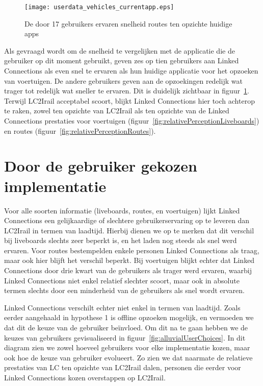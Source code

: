 \begin{figure}[ht]
	\centering
	\texttt{[image: userdata\_vehicles\_currentapp.eps]}
	\caption[Door gebruikers ervaren snelheid voertuigen tov huidige apps]{De door 17 gebruikers ervaren snelheid routes ten opzichte huidige apps }
	\label{fig:relativePerceptionVehicles}
\end{figure}

Als gevraagd wordt om de snelheid te vergelijken met de applicatie die de gebruiker op dit moment gebruikt, geven zes op tien gebruikers aan Linked Connections als even snel te ervaren als hun huidige applicatie voor het opzoeken van voertuigen. De andere gebruikers geven aan de opzoekingen redelijk wat trager tot redelijk wat sneller te ervaren. Dit is duidelijk zichtbaar in figuur~\ref{fig:relativePerceptionVehicles}. Terwijl LC2Irail acceptabel scoort, blijkt Linked Connections hier toch achterop te raken, zowel ten opzichte van LC2Irail als ten opzichte van de Linked Connections prestaties voor voertuigen (figuur~\ref{fig:relativePerceptionLiveboards}) en routes (figuur~\ref{fig:relativePerceptionRoutes}).

\section{Door de gebruiker gekozen implementatie}

Voor alle soorten informatie (liveboards, routes, en voertuigen) lijkt Linked Connections een gelijkaardige of slechtere gebruikerservaring op te leveren dan LC2Irail in termen van laadtijd. Hierbij dienen we op te merken dat dit verschil bij liveboards slechts zeer beperkt is, en het laden nog steeds als snel werd ervaren. Voor routes bestempelden enkele personen Linked Connections als traag, maar ook hier blijft het verschil beperkt. Bij voertuigen blijkt echter dat Linked Connections door drie kwart van de gebruikers als trager werd ervaren, waarbij Linked Connections niet enkel relatief slechter scoort, maar ook in absolute termen slechts door een minderheid van de gebruikers als snel wordt ervaren. 

Linked Connections verschilt echter niet enkel in termen van laadtijd. Zoals eerder aangehaald in hypothese 1 is offline opzoeken mogelijk, en vermoeden we dat dit de keuze van de gebruiker beïnvloed. Om dit na te gaan hebben we de keuzes van gebruikers gevisualiseerd in figuur~\ref{fig:alluvialUserChoices}. In dit diagram zien we zowel hoeveel gebruikers voor elke implementatie kozen, maar ook hoe de keuze van gebruiker evolueert. Zo zien we dat naarmate de relatieve prestaties van LC ten opzichte van LC2Irail dalen, personen die eerder voor Linked Connections kozen overstappen op LC2Irail.

